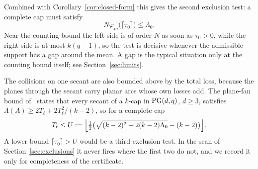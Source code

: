 Combined with Corollary~\ref{cor:closed-form} this gives the second
exclusion test: a complete cap must satisfy
\begin{equation}
 N\varphi_m\bigl(\lceil\tau_0\rceil\bigr)\le\Lambda_0 .
\label{eq:budget}
\end{equation}
Near the counting bound the left side is of order \(N\) as soon as
\(\tau_0>0\), while the right side is at most \(k(q-1)\), so the test is
decisive whenever the admissible support has a gap around the mean.
A gap is the typical situation only at the counting bound itself; see
Section~\ref{sec:limits}.

The collisions on one secant are also bounded above by the total loss,
because the planes through the secant carry planar arcs whose own losses
add.  The plane-fan bound of~\cite[Section~5]{RuddSecantDefects} states
that every secant of a \(k\)-cap in \(\mathrm{PG}(d,q)\), \(d\ge3\), satisfies
\(\Lambda(A)\ge2T_\ell+2T_\ell^2/(k-2)\), so for a complete cap
\begin{equation}
 T_\ell\le U:=\Bigl\lfloor\tfrac12\bigl(\sqrt{(k-2)^2+2(k-2)\Lambda_0}-(k-2)\bigr)\Bigr\rfloor .
\label{eq:ceiling}
\end{equation}
A lower bound \(\lceil\tau_0\rceil>U\) would be a third exclusion test.
In the scan of Section~\ref{sec:exclusions} it never fires where the
first two do not, and we record it only for completeness of the
certificate.

